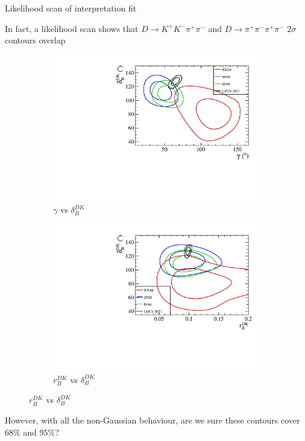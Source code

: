 \documentclass[xcolor={dvipsnames}]{beamer}
\begin{document}
\begin{frame}{Likelihood scan of interpretation fit}
  \begin{center}
    In fact, a likelihood scan shows that $D\to K^+K^-\pi^+\pi^-$ and $D\to\pi^+\pi^-\pi^+\pi^-$ $2\sigma$ contours overlap
  \end{center}
  \begin{figure}
    \centering
    \begin{subfigure}{0.50\textwidth}
      \centering
      \includegraphics[width=1.0\textwidth]{Plots/gamma_deltaB_hhpipi_LHCb_Prob_scan.pdf}
      \caption*{$\gamma$ vs $\delta_B^{DK}$}
    \end{subfigure}%
    \begin{subfigure}{0.50\textwidth}
      \centering
      \includegraphics[width=1.0\textwidth]{Plots/rB_deltaB_hhpipi_LHCb_Prob_scan.pdf}
      \caption*{$r_B^{DK}$ vs $\delta_B^{DK}$}
    \end{subfigure}
  \end{figure}
  \vspace{-0.3cm}
  \begin{center}
    However, with all the non-Gaussian behaviour, are we sure these contours cover $68\%$ and $95\%$\phantom{y}?
  \end{center}
\end{frame}
\end{document}
